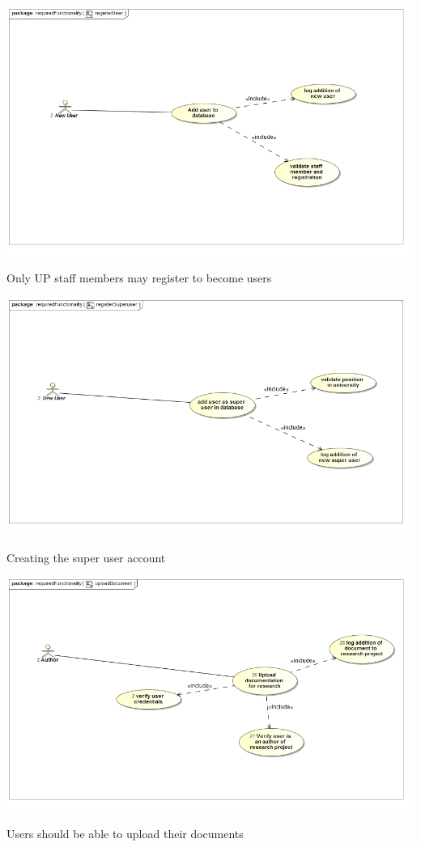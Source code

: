 \documentclass[a4paper,12pt]{report}
\begin{document}
\begin{flushleft}
	\includegraphics[scale=0.5]{./images/uc__registerUser.jpg}
	\begin{center}
		Only UP staff members may register to become users
	\end{center}

	\includegraphics[scale=0.5]{./images/uc__registerSuperuser.jpg}
	\begin{center}
		Creating the super user account
	\end{center}
\end{flushleft}

\newpage

\begin{flushleft}
	\includegraphics[scale=0.5]{./images/uc__uploadDocument.jpg}
	\begin{center}
		Users should be able to upload their documents
	\end{center}
\end{flushleft}
\end{document}
